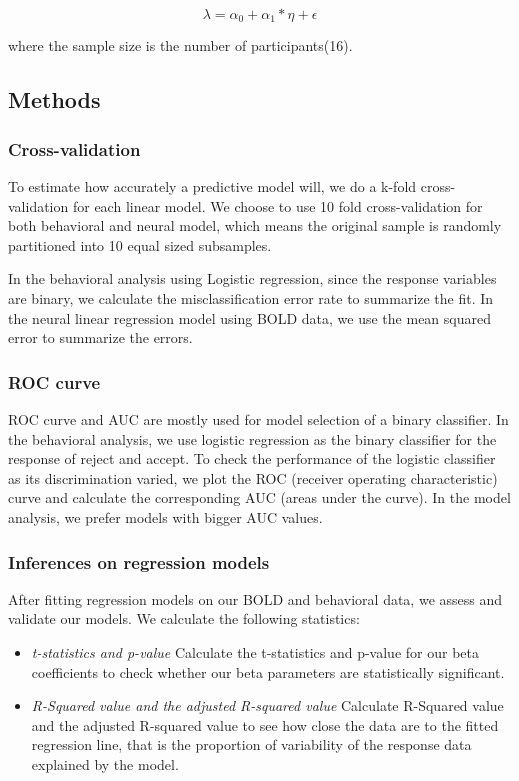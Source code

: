 \documentclass[11pt]{article}
\begin{document}
\begin{equation}
\lambda = \alpha_0 + \alpha_1 * \eta + \epsilon
\end{equation}

where the sample size is the number of participants(16).

\subsection{Methods}

\subsubsection{Cross-validation}

To estimate how accurately a predictive model will, we do a k-fold cross-validation for each linear
model. We choose to use 10 fold cross-validation for both behavioral and neural model,
which means the original sample is randomly partitioned into 10 equal sized 
subsamples. 
\par
In the behavioral analysis using Logistic regression, since the response 
variables are binary, we calculate the misclassification error rate to 
summarize the fit. In the neural linear regression model using BOLD data, we 
use the mean squared error to summarize the errors.

\subsubsection{ROC curve}

ROC curve and AUC are mostly used for model selection of a binary classifier. In the behavioral analysis, we use logistic regression as the binary classifier for the response of reject and accept. To check the performance of the logistic classifier as its discrimination varied, we plot the ROC (receiver operating characteristic) curve and calculate the corresponding AUC (areas under the curve). In the model analysis, we prefer models with bigger AUC values.

\subsubsection{Inferences on regression models}

After fitting regression models on our BOLD and behavioral data, we assess 
and validate our models. We calculate the following statistics:
\begin{itemize}
\item \emph{t-statistics and p-value} Calculate the t-statistics and p-value for 
our beta coefficients to check whether our beta parameters are statistically 
significant.
\item \emph{R-Squared value and the adjusted R-squared value} Calculate R-Squared value and the adjusted R-squared value to see how close the data are to the fitted regression line, that is the proportion of variability of the response data explained by the model.
\end{itemize}
\end{document}
